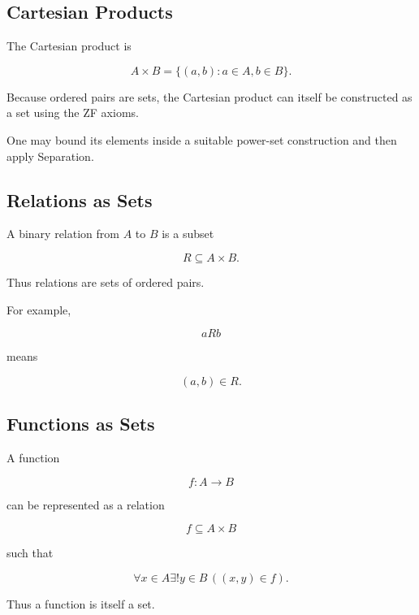 \subsection{Cartesian Products}
\label{subsec:axiomatic-cartesian-products}

The Cartesian product is

\[
\boxed{
A\times B
=
\{
(a,b):
a\in A,
b\in B
\}.
}
\]

Because ordered pairs are sets, the Cartesian product can itself be
constructed as a set using the ZF axioms.

One may bound its elements inside a suitable power-set construction and
then apply Separation.

\subsection{Relations as Sets}
\label{subsec:relations-as-sets}

A binary relation from \(A\) to \(B\) is a subset

\[
\boxed{
R
\subseteq
A\times B.
}
\]

Thus relations are sets of ordered pairs.

For example,

\[
aRb
\]

means

\[
\boxed{
(a,b)\in R.
}
\]

\subsection{Functions as Sets}
\label{subsec:functions-as-sets}

A function

\[
f:A\to B
\]

can be represented as a relation

\[
f
\subseteq
A\times B
\]

such that

\[
\boxed{
\forall x\in A
\exists!y\in B
\,
((x,y)\in f).
}
\]

Thus a function is itself a set.

